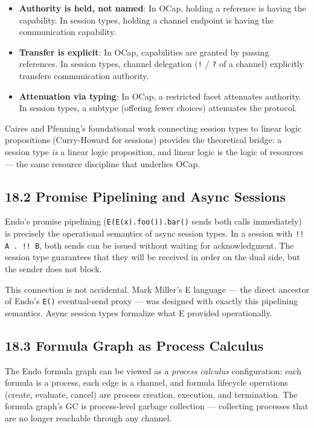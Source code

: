 \documentclass[11pt]{article}
\begin{document}
\begin{itemize}
\item \textbf{Authority is held, not named}: In OCap, holding a reference is having
the capability. In session types, holding a channel endpoint is having
the communication capability.
\item \textbf{Transfer is explicit}: In OCap, capabilities are granted by passing
references. In session types, channel delegation (\texttt{!} / \texttt{?} of a channel)
explicitly transfers communication authority.
\item \textbf{Attenuation via typing}: In OCap, a restricted facet attenuates
authority. In session types, a subtype (offering fewer choices) attenuates
the protocol.
\end{itemize}

Caires and Pfenning's foundational work connecting session types to linear
logic propositions (Curry-Howard for sessions) provides the theoretical
bridge: a session type \emph{is} a linear logic proposition, and linear logic
is the logic of resources --- the same resource discipline that underlies
OCap.
\subsection{18.2 Promise Pipelining and Async Sessions}
\label{sec:org16146cb}

Endo's promise pipelining (\texttt{E(E(x).foo()).bar()} sends both calls
immediately) is precisely the operational semantics of async session types.
In a session with \texttt{!! A . !! B}, both sends can be issued without waiting
for acknowledgment. The session type guarantees that they will be received
in order on the dual side, but the sender does not block.

This connection is not accidental. Mark Miller's E language --- the direct
ancestor of Endo's \texttt{E()} eventual-send proxy --- was designed with
exactly this pipelining semantics. Async session types formalize what E
provided operationally.
\subsection{18.3 Formula Graph as Process Calculus}
\label{sec:orgf1e2fb9}

The Endo formula graph can be viewed as a \emph{process calculus} configuration:
each formula is a process, each edge is a channel, and formula lifecycle
operations (create, evaluate, cancel) are process creation, execution, and
termination. The formula graph's GC is process-level garbage collection ---
collecting processes that are no longer reachable through any channel.
\end{document}
